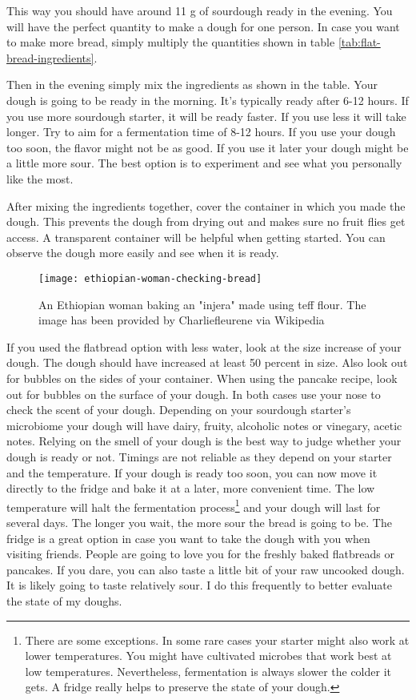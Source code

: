 This way you should have around 11 g of sourdough ready in the evening. You will have
the perfect quantity to make a dough for one person. In case you want to make more
bread, simply multiply the quantities shown in table \ref*{tab:flat-bread-ingredients}.

Then in the evening simply mix the ingredients as shown in the table. Your dough
is going to be ready in the morning. It's typically ready after 6-12 hours. If
you use more sourdough starter, it will be ready faster. If you use less it will take
longer. Try to aim for a fermentation time of 8-12 hours. If you use
your dough too soon, the flavor might not be as good. If you use it later
your dough might be a little more sour. The best option is to experiment
and see what you personally like the most.

After mixing the ingredients together, cover the container in which
you made the dough. This prevents the dough from drying out and makes
sure no fruit flies get access. A transparent container will be helpful
when getting started. You can observe the dough more easily and see when
it is ready.

\begin{figure}[htb!]
  \texttt{[image: ethiopian-woman-checking-bread]}
  \centering
  \caption{An Ethiopian woman baking an "injera" made using teff flour.
  The image has been provided by Charliefleurene via Wikipedia}
\end{figure}

If you used the flatbread option with less water, look at the size increase
of your dough. The dough should have increased at least 50 percent in size.
Also look out for bubbles on the sides of your container.
When using the pancake recipe, look out for bubbles on the surface of your dough.
In both cases use your nose to check the scent of your dough. Depending
on your sourdough starter's microbiome your dough will have
dairy, fruity, alcoholic notes or vinegary, acetic notes. Relying
on the smell of your dough is the best way to judge whether your
dough is ready or not. Timings are not reliable as they
depend on your starter and the temperature. If your dough
is ready too soon, you can now move it directly to the fridge and bake
it at a later, more convenient time. The low temperature will halt the fermentation
process\footnote{There are some exceptions. In some rare cases your starter
might also work at lower temperatures. You might have cultivated microbes that work best at
low temperatures. Nevertheless, fermentation
is always slower the colder it gets. A fridge really helps to preserve the state
of your dough.}
and your dough will last for several days. The longer you wait, the more sour the
bread is going to be. The fridge is a great option in case you want to
take the dough with you when visiting friends. People are going
to love you for the freshly baked flatbreads or pancakes. If you dare,
you can also taste a little bit of your raw uncooked dough. It is likely
going to taste relatively sour. I do this frequently to better evaluate the
state of my doughs.


